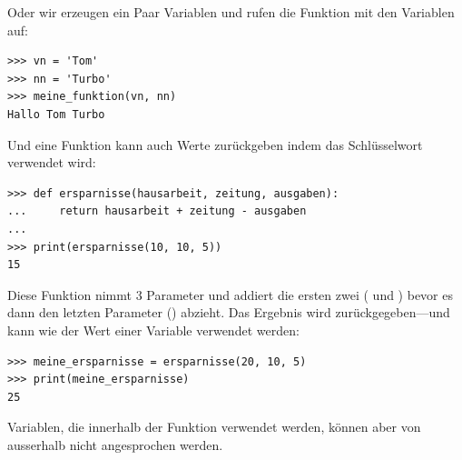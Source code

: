 \noindent
Oder wir erzeugen ein Paar Variablen und rufen die Funktion mit den Variablen auf:

\begin{Verbatim}[frame=single]
>>> vn = 'Tom'
>>> nn = 'Turbo'
>>> meine_funktion(vn, nn)
Hallo Tom Turbo
\end{Verbatim}

\noindent
Und eine Funktion kann auch Werte zurückgeben indem das  Schlüsselwort verwendet wird:

\begin{Verbatim}[frame=single]
>>> def ersparnisse(hausarbeit, zeitung, ausgaben):
...     return hausarbeit + zeitung - ausgaben
...
>>> print(ersparnisse(10, 10, 5))
15
\end{Verbatim}

Diese Funktion nimmt 3 Parameter und addiert die ersten zwei ( und ) bevor es dann den letzten Parameter () abzieht. Das Ergebnis wird zurückgegeben---und kann wie der Wert einer Variable verwendet werden:

\begin{Verbatim}[frame=single]
>>> meine_ersparnisse = ersparnisse(20, 10, 5)
>>> print(meine_ersparnisse)
25
\end{Verbatim}

\noindent
Variablen, die innerhalb der Funktion verwendet werden, können aber von ausserhalb nicht angesprochen werden.

